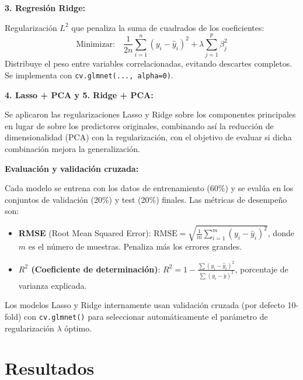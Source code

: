 \documentclass[a4paper,twocolumn]{article}
\begin{document}
	\vspace{0.2cm}

	\textbf{3. Regresión Ridge:}
	
	\vspace{0.2cm}

	Regularización $L^2$ que penaliza la suma de cuadrados de los coeficientes:
	\[
	\text{Minimizar:} \quad \frac{1}{2n} \sum_{i=1}^{n} (y_i - \hat{y}_i)^2 + \lambda \sum_{j=1}^{p} \beta_j^2
	\]
	Distribuye el peso entre variables correlacionadas, evitando descartes completos. Se implementa con \texttt{cv.glmnet(..., alpha=0)}.

	\vspace{0.2cm}

	\textbf{4. Lasso + PCA y 5. Ridge + PCA:}
	
	\vspace{0.2cm}

	Se aplicaron las regularizaciones Lasso y Ridge sobre los componentes principales en lugar de sobre los predictores originales, combinando así la reducción de dimensionalidad (PCA) con la regularización, con el objetivo de evaluar si dicha combinación mejora la generalización.

	\vspace{0.2cm}

	\textbf{Evaluación y validación cruzada:}
	
	\vspace{0.2cm}

	Cada modelo se entrena con los datos de entrenamiento (60\%) y se evalúa en los conjuntos de validación (20\%) y test (20\%) finales. Las métricas de desempeño son:
	\begin{itemize}
	  \item \textbf{RMSE} (Root Mean Squared Error): $\text{RMSE} = \sqrt{\frac{1}{m}\sum_{i=1}^{m}(y_i - \hat{y}_i)^2}$, donde $m$ es el número de muestras. Penaliza más los errores grandes.
	  \item \textbf{$R^2$ (Coeficiente de determinación)}: $R^2 = 1 - \frac{\sum (y_i - \hat{y}_i)^2}{\sum (y_i - \bar{y})^2}$, porcentaje de varianza explicada.
	\end{itemize}

	Los modelos Lasso y Ridge internamente usan validación cruzada (por defecto 10-fold) con \texttt{cv.glmnet()} para seleccionar automáticamente el parámetro de regularización $\lambda$ óptimo.


	\section{Resultados}
	\label{sec:resultados}
\end{document}
